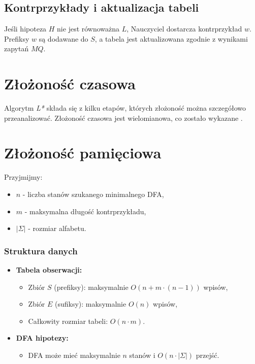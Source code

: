 \subsection{Kontrprzykłady i aktualizacja tabeli}

Jeśli hipoteza \( H \) nie jest równoważna \( L \), Nauczyciel dostarcza kontrprzykład \( w \). Prefiksy \( w \) są dodawane do \( S \), a tabela jest aktualizowana zgodnie z wynikami zapytań \( MQ \).

\section{Złożoność czasowa}

Algorytm \textit{L*} składa się z kilku etapów, których złożoność można szczegółowo przeanalizować. Złożoność czasowa jest wielomianowa, co zostało wykazane \cite{L_STAR}.

\section{Złożoność pamięciowa}

Przyjmijmy:
\begin{itemize}
    \item \(n\) - liczba stanów szukanego minimalnego DFA,
    \item \(m\) - maksymalna długość kontrprzykładu,
    \item \(|\Sigma|\) - rozmiar alfabetu.
\end{itemize}

\subsubsection*{Struktura danych}
\begin{itemize}
    \item \textbf{Tabela obserwacji:}
    \begin{itemize}
        \item Zbiór \(S\) (prefiksy): maksymalnie \(O(n + m \cdot (n - 1))\) wpisów,
        \item Zbiór \(E\) (sufiksy): maksymalnie \(O(n)\) wpisów,
        \item Całkowity rozmiar tabeli: \(O(n \cdot m)\).
    \end{itemize}
    \item \textbf{DFA hipotezy:}
    \begin{itemize}
        \item DFA może mieć maksymalnie \(n\) stanów i \(O(n \cdot |\Sigma|)\) przejść.
    \end{itemize}
\end{itemize}

